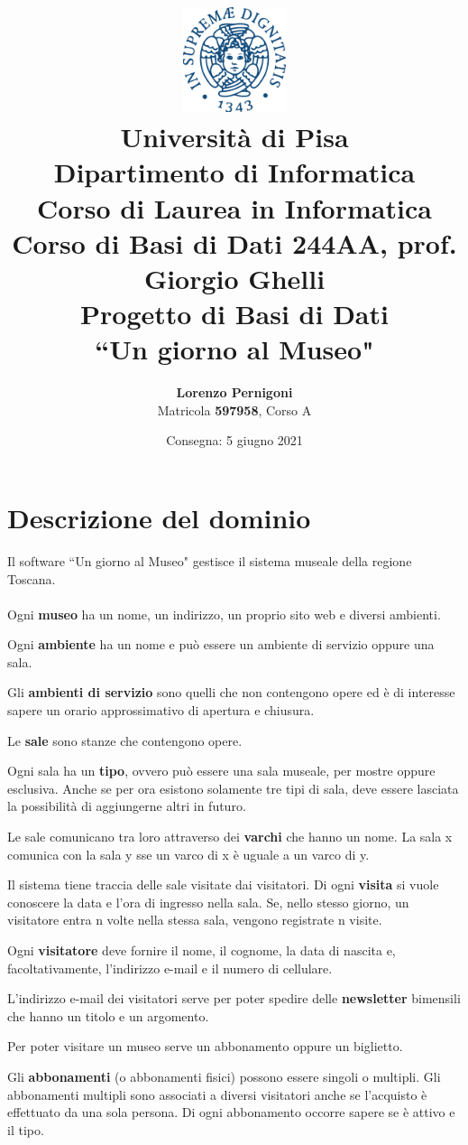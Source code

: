 \documentclass[a4paper, 12pt]{article}
\title{
    \centering
    \includegraphics[width=3cm]{stemma_unipi.png}
    \\[0.3cm]{\small Università di Pisa
            \\Dipartimento di Informatica
            \\Corso di Laurea in Informatica
            \\[1cm]Corso di Basi di Dati 244AA, prof. Giorgio Ghelli
            \\[1cm]}
    Progetto di Basi di Dati\\``Un giorno al Museo"\vspace{1cm}
}
\author{\textbf{Lorenzo Pernigoni}\\\vspace{0.3cm}Matricola \textbf{597958}, Corso A}
\date{\vspace{1cm}Consegna: 5 giugno 2021}
\begin{document}
\maketitle
\clearpage
\section{Descrizione del dominio}
Il software ``Un giorno al Museo" gestisce il sistema museale della regione Toscana.
\\\\
Ogni \textbf{museo} ha un nome, un indirizzo, un proprio sito web e diversi ambienti.

\noindent Ogni \textbf{ambiente} ha un nome e può essere un ambiente di servizio oppure una sala.

\noindent Gli \textbf{ambienti di servizio} sono quelli che non contengono opere ed è di interesse sapere un orario approssimativo di apertura e chiusura.

\noindent Le \textbf{sale} sono stanze che contengono opere.

\noindent Ogni sala ha un \textbf{tipo}, ovvero può essere una sala museale, per mostre oppure esclusiva. Anche se per ora esistono solamente tre tipi di sala, deve essere lasciata la possibilità di aggiungerne altri in futuro.

\noindent Le sale comunicano tra loro attraverso dei \textbf{varchi} che hanno un nome. 
La sala x comunica con la sala y sse un varco di x è uguale a un varco di y.

\noindent Il sistema tiene traccia delle sale visitate dai visitatori. Di ogni \textbf{visita} si vuole conoscere la data e l'ora di ingresso nella sala. Se, nello stesso giorno, un visitatore entra n volte nella stessa sala, vengono registrate n visite.

\noindent Ogni \textbf{visitatore} deve fornire il nome, il cognome, la data di nascita e, facoltativamente, l'indirizzo e-mail e il numero di cellulare.

\noindent L'indirizzo e-mail dei visitatori serve per poter spedire delle \textbf{newsletter} bimensili che hanno un titolo e un argomento. 

\noindent Per poter visitare un museo serve un abbonamento oppure un biglietto.

\noindent Gli \textbf{abbonamenti} (o abbonamenti fisici) possono essere singoli o multipli. Gli abbonamenti multipli sono associati a diversi visitatori anche se l'acquisto è effettuato da una sola persona. Di ogni abbonamento occorre sapere se è attivo e il tipo.
\end{document}
